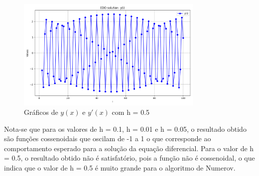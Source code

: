 \documentclass[12pt, a4paper]{article} %
\begin{document}
        \begin{figure}[H]
            \centering
            \includegraphics[width=0.8\textwidth]{../images/results-ex-3-3.png}
            \caption{Gr\'aficos de $y(x)$ e $y'(x)$ com h = 0.5}
        \end{figure}
        

        Nota-se que para os valores de h = 0.1, h = 0.01 e h = 0.05, o resultado obtido s\~ao fun\c{c}\~oes cossenoidais que oscilam de -1 a 1 o que corresponde ao comportamento esperado para a solu\c{c}\~ao da equa\c{c}\~ao diferencial. Para o valor de h = 0.5, o resultado obtido n\~ao \'e satisfat\'orio, pois a fun\c{c}\~ao n\~ao \'e cossenoidal, o que indica que o valor de h = 0.5 \'e muito grande para o algoritmo de Numerov.
        
\end{document}
